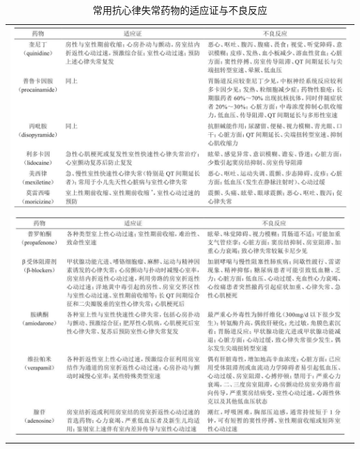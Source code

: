 \begin{longtable}{c}
 \caption{常用抗心律失常药物的适应证与不良反应}
 \label{tab151-3}
 \endfirsthead
 \caption[]{常用抗心律失常药物的适应证与不良反应}
 \endhead
 \includegraphics[width=\textwidth,height=\textheight,keepaspectratio]{./images/Image00570.jpg}\\
 \includegraphics[width=\textwidth,height=\textheight,keepaspectratio]{./images/Image00571.jpg}
 \end{longtable}


